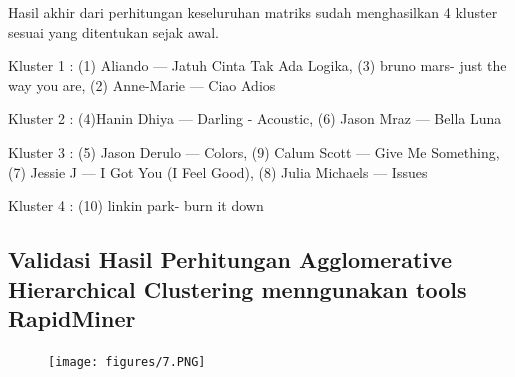 Hasil akhir dari perhitungan keseluruhan matriks sudah menghasilkan 4 kluster sesuai yang ditentukan sejak awal.

Kluster 1 : (1) Aliando --- Jatuh Cinta Tak Ada Logika, (3) bruno mars- just the             way you are, (2) Anne-Marie --- Ciao Adios

Kluster 2 : (4)Hanin Dhiya --- Darling - Acoustic, (6) Jason Mraz --- Bella Luna

Kluster 3 : (5) Jason Derulo --- Colors, (9) Calum Scott --- Give Me Something,              (7) Jessie J --- I Got You (I Feel Good), (8) Julia Michaels --- Issues

Kluster 4 : (10) linkin park- burn it down

\subsection{ Validasi Hasil Perhitungan Agglomerative Hierarchical Clustering menngunakan tools RapidMiner}
 \begin{figure} [htbp]
    \texttt{[image: figures/7.PNG]}
    \end{figure}
    \vspace{5cm}

